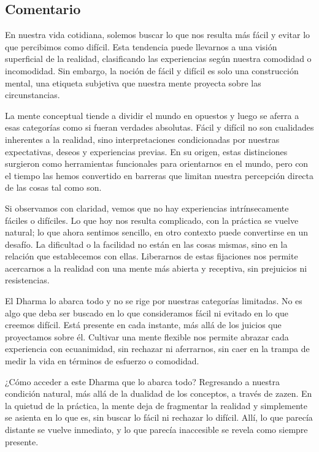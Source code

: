 \documentclass[
  a5paperpaper,
]{article}
\begin{document}
\hfill\break

\hypertarget{comentario-30}{%
\subsection{Comentario}\label{comentario-30}}

En nuestra vida cotidiana, solemos buscar lo que nos resulta más fácil y
evitar lo que percibimos como difícil. Esta tendencia puede llevarnos a
una visión superficial de la realidad, clasificando las experiencias
según nuestra comodidad o incomodidad. Sin embargo, la noción de fácil y
difícil es solo una construcción mental, una etiqueta subjetiva que
nuestra mente proyecta sobre las circunstancias.

La mente conceptual tiende a dividir el mundo en opuestos y luego se
aferra a esas categorías como si fueran verdades absolutas. Fácil y
difícil no son cualidades inherentes a la realidad, sino
interpretaciones condicionadas por nuestras expectativas, deseos y
experiencias previas. En su origen, estas distinciones surgieron como
herramientas funcionales para orientarnos en el mundo, pero con el
tiempo las hemos convertido en barreras que limitan nuestra percepción
directa de las cosas tal como son.

Si observamos con claridad, vemos que no hay experiencias
intrínsecamente fáciles o difíciles. Lo que hoy nos resulta complicado,
con la práctica se vuelve natural; lo que ahora sentimos sencillo, en
otro contexto puede convertirse en un desafío. La dificultad o la
facilidad no están en las cosas mismas, sino en la relación que
establecemos con ellas. Liberarnos de estas fijaciones nos permite
acercarnos a la realidad con una mente más abierta y receptiva, sin
prejuicios ni resistencias.

El Dharma lo abarca todo y no se rige por nuestras categorías limitadas.
No es algo que deba ser buscado en lo que consideramos fácil ni evitado
en lo que creemos difícil. Está presente en cada instante, más allá de
los juicios que proyectamos sobre él. Cultivar una mente flexible nos
permite abrazar cada experiencia con ecuanimidad, sin rechazar ni
aferrarnos, sin caer en la trampa de medir la vida en términos de
esfuerzo o comodidad.

¿Cómo acceder a este Dharma que lo abarca todo? Regresando a nuestra
condición natural, más allá de la dualidad de los conceptos, a través de
zazen. En la quietud de la práctica, la mente deja de fragmentar la
realidad y simplemente se asienta en lo que es, sin buscar lo fácil ni
rechazar lo difícil. Allí, lo que parecía distante se vuelve inmediato,
y lo que parecía inaccesible se revela como siempre presente.
\end{document}
